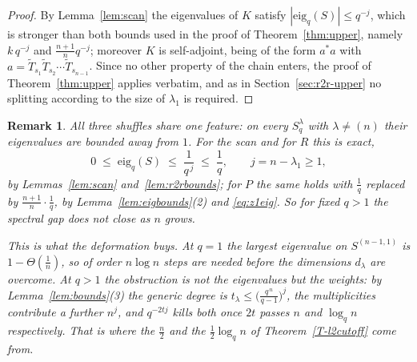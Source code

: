 \documentclass[11pt]{article}
\theoremstyle{plain}  %
\newtheorem{remark}[theorem]{Remark}
\newcommand{\eig}{\text{eig}} %
\begin{document}
\begin{proof}
By Lemma~\ref{lem:scan} the eigenvalues of $K$ satisfy
$|\eig_q(S)| \le q^{-j}$, which is stronger than both bounds used in the proof
of Theorem~\ref{thm:upper}, namely $k\,q^{-j}$ and $\frac{n+1}{n}q^{-j}$; moreover $K$ is
self-adjoint, being of the form $a^{*}a$ with
$a = \widetilde{T}_{s_{1}}\widetilde{T}_{s_{2}}\cdots\widetilde{T}_{s_{n-1}}$.
Since no other property of the chain enters, the proof of
Theorem~\ref{thm:upper} applies verbatim, and as in
Section~\ref{sec:r2r-upper} no splitting according to the size of
$\lambda_1$ is required.
\end{proof}


\begin{remark}\label{rem:gap}
All three shuffles share one feature: on every $S^{\lambda}_q$ with $\lambda \ne (n)$ their
eigenvalues are bounded away from $1$. For the scan and for $R$ this is exact,
$$
  0 \;\le\; \eig_q(S) \;\le\; \frac{1}{q^{\,j}} \;\le\; \frac1q ,
  \qquad j = n-\lambda_1 \ge 1 ,
$$
by Lemmas~\ref{lem:scan} and~\ref{lem:r2rbounds}; for $P$ the same holds with $\frac1q$
replaced by $\frac{n+1}{n}\cdot\frac1q$, by Lemma~\ref{lem:eigbounds}(2) and
\eqref{eq:z1eig}. So for fixed $q>1$ the spectral gap does not close as $n$ grows.

This is what the deformation buys. At $q=1$ the largest eigenvalue on $S^{(n-1,1)}$ is
$1-\Theta(\frac{1}{n})$, so of order $n\log n$ steps are needed before the dimensions $d_\lambda$
are overcome. At $q>1$ the obstruction is not the eigenvalues but the weights: by
Lemma~\ref{lem:bounds}(3) the generic degree is
$t_\lambda \le \bigl(\frac{q^{\,n}}{q-1}\bigr)^{j}$, the multiplicities contribute a further
$n^{j}$, and $q^{-2tj}$ kills both once $2t$ passes $n$ and $\log_q n$ respectively. That
is where the $\frac n2$ and the $\frac12\log_q n$ of Theorem~\ref{T-l2cutoff} come from.
\end{remark}

\end{document}
